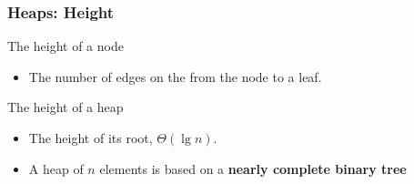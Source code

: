 \documentclass[UTF8,11pt]{beamer}
\begin{document}
\begin{frame}           %
\frametitle{Heaps: Height}
\begin{block}{The height of a node}
	\begin{itemize}
		\item The number of edges on the  from the node to a leaf.
	\end{itemize}
	 
\end{block}

\pause
\begin{block}{The height of a heap}
	\begin{itemize}
		\item The height of its root, {\color{blue}$\Theta(\lg{n})$}.
		\item A heap of $n$ elements is based on a \textbf{nearly complete binary tree}
	
	\end{itemize}
\end{block}
\begin{block}{}
	\begin{center}
	\end{center}
\end{block}
\end{frame}
\end{document}
